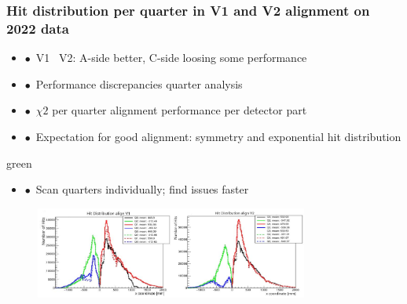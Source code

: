 \documentclass[aspectratio=1610, 12pt, xcolor=dvipsnames]{beamer}
\begin{document}
\begin{frame}\frametitle{Hit distribution per quarter in V1 and V2 alignment on 2022 data}
  \begin{itemize}
    \item $\bullet$\, V1 \to\, V2: A-side better, C-side loosing some performance
    \item $\bullet$\, Performance discrepancies \to quarter analysis
    \item $\bullet$\, $\chi2$ per quarter \to alignment performance per detector part
    \item $\bullet$\, Expectation for good alignment: symmetry and exponential hit distribution
  \end{itemize}
  \begin{mybox}{green}{}
    \begin{itemize}
      \item $\bullet$\, Scan quarters individually; find issues faster
    \end{itemize}
  \end{mybox}
  \begin{figure}
      \includegraphics[width=0.8\textwidth]{logos/v1_v2.png}%
  \end{figure}
\end{frame}
\end{document}
